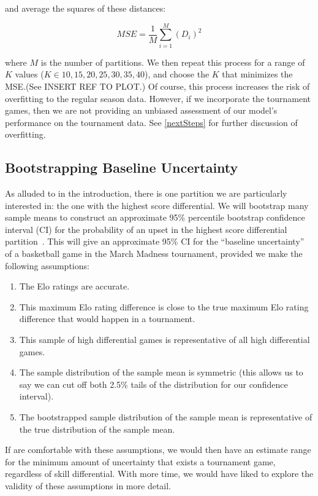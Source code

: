 \documentclass{article}
\begin{document}
and average the squares of these distances:

\[
MSE = \frac{1}{M}\sum_{i=1}^M {(D_i)}^2
\]

where $M$ is the number of partitions. We then repeat this process for a range of $K$ values ($K \in {10, 15, 20, 25, 30, 35, 40}$), and choose the $K$ that minimizes the MSE.\@ (See INSERT REF TO PLOT.) Of course, this process increases the risk of overfitting to the regular season data. However, if we incorporate the tournament games, then we are not providing an unbiased assessment of our model's performance on the tournament data. See \autoref{nextSteps} for further discussion of overfitting.

\subsection{Bootstrapping Baseline Uncertainty}
As alluded to in the introduction, there is one partition we are particularly interested in: the one with the highest score differential. We will bootstrap many sample means to construct an approximate 95\% percentile bootstrap confidence interval (CI) for the probability of an upset in the highest score differential partition~\cite{uchicagoPercentileBootstrap}\cite{hesterberg_bootstrap_2015}. This will give an approximate 95\% CI for the ``baseline uncertainty'' of a basketball game in the March Madness tournament, provided we make the following assumptions:
\begin{enumerate}
    \item The Elo ratings are accurate.
    \item This maximum Elo rating difference is close to the true maximum Elo rating difference that would happen in a tournament. 
    \item This sample of high differential games is representative of all high differential games.
    \item The sample distribution of the sample mean is symmetric (this allows us to say we can cut off both 2.5\% tails of the distribution for our confidence interval).
    \item The bootstrapped sample distribution of the sample mean is representative of the true distribution of the sample mean.
\end{enumerate}

If are comfortable with these assumptions, we would then have an estimate range for the minimum amount of uncertainty that exists a tournament game, regardless of skill differential. With more time, we would have liked to explore the validity of these assumptions in more detail.
\end{document}
